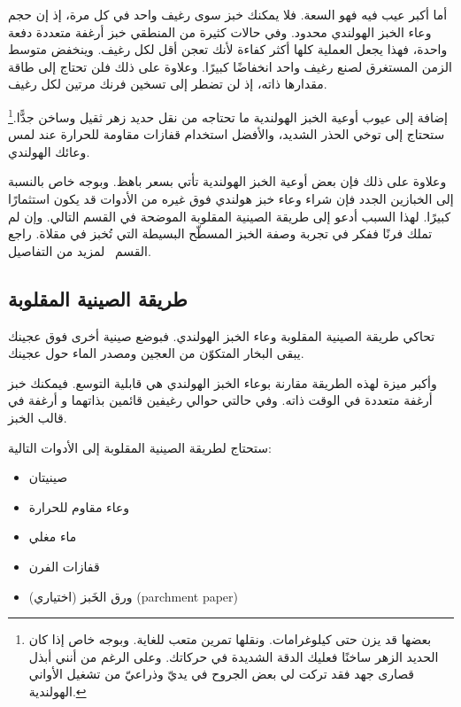 أما أكبر عيب فيه فهو السعة. فلا يمكنك خبز سوى رغيف واحد في كل مرة، إذ إن حجم وعاء الخبز الهولندي محدود. وفي حالات كثيرة من المنطقي خبز أرغفة متعددة دفعة واحدة، فهذا يجعل العملية كلها أكثر كفاءة لأنك تعجن أقل لكل رغيف. وينخفض متوسط الزمن المستغرق لصنع رغيف واحد انخفاضًا كبيرًا. وعلاوة على ذلك فلن تحتاج إلى طاقة مقدارها ذاته، إذ لن تضطر إلى تسخين فرنك مرتين لكل رغيف.

إضافة إلى عيوب أوعية الخبز الهولندية ما تحتاجه من نقل حديد زهر ثقيل وساخن جدًّا.\footnote{بعضها قد يزن حتى  كيلوغرامات. ونقلها تمرين متعب للغاية. وبوجه خاص إذا كان الحديد الزهر ساخنًا فعليك الدقة الشديدة في حركاتك. وعلى الرغم من أنني أبذل قصارى جهد فقد تركت لي بعض الجروح في يديّ وذراعيّ من تشغيل الأواني الهولندية.}
ستحتاج إلى توخي الحذر الشديد، والأفضل استخدام قفازات مقاومة للحرارة عند لمس وعائك الهولندي.

وعلاوة على ذلك فإن بعض أوعية الخبز الهولندية تأتي بسعر باهظ. وبوجه خاص بالنسبة إلى الخبازين الجدد فإن شراء وعاء خبز هولندي فوق غيره من الأدوات قد يكون استثمارًا كبيرًا. لهذا السبب أدعو إلى طريقة الصينية المقلوبة الموضحة في القسم التالي. وإن لم تملك فرنًا ففكر في تجربة وصفة الخبز المسطّح البسيطة التي تُخبز في مقلاة. راجع القسم~ لمزيد من التفاصيل.


\subsection{طريقة الصينية المقلوبة}

تحاكي طريقة الصينية المقلوبة وعاء الخبز الهولندي. فبوضع صينية أخرى فوق عجينك يبقى البخار المتكوّن من العجين ومصدر الماء حول عجينك.

\begin{flowchart}[!htb]
\centering
  
  \caption[عملية الخَبز بالصينية المقلوبة]{تمثيل تخطيطي لطريقة الخَبز بالصينية المقلوبة التي تعمل بشكل رائع في الأفران المنزلية.}%
  \label{fig:inverted-tray-process}
\end{flowchart}


وأكبر ميزة لهذه الطريقة مقارنة بوعاء الخبز الهولندي هي قابلية التوسع. فيمكنك خبز أرغفة متعددة في الوقت ذاته. وفي حالتي حوالي رغيفين قائمين بذاتهما و أرغفة في قالب الخبز.

ستحتاج لطريقة الصينية المقلوبة إلى الأدوات التالية:
\begin{itemize}
\item صينيتان
\item وعاء مقاوم للحرارة
\item ماء مغلي
\item قفازات الفرن
\item (اختياري) ورق الخَبز \textenglish{(parchment paper)}
\end{itemize}

